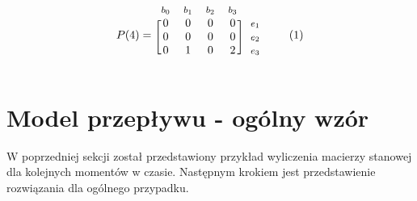 \documentclass[12pt]{book}
\newcommand\addtag{\refstepcounter{equation}
\renewcommand{\labelenumii}{\theenumii}
\renewcommand{\theenumii}{\theenumi.\arabic{enumii}.}
\tag{\theequation}}
\begin{document}
\begin{equation*}
  P(4)=
  \begin{blockarray}{*{4}{c} l}
    \begin{block}{*{4}{>{$\footnotesize}c<{$}} l}
     $b_0$ & $b_1$ & $b_2$ & $b_3$ \\
    \end{block}
    \begin{block}{[*{4}{c}]>{$\footnotesize}l<{$}}
       0 & 0 & 0 & 0 & $e_1$ \\
       0 & 0 & 0 & 0 & $e_2$ \\
       0 & 1 & 0 & 2 & $e_3$ \\
    \end{block}
  \end{blockarray} \addtag
\end{equation*}

\section{Model przepływu - ogólny wzór}
W poprzedniej sekcji został przedstawiony przykład wyliczenia macierzy stanowej dla kolejnych momentów w czasie. Następnym krokiem jest przedstawienie rozwiązania dla ogólnego przypadku. \\ 
\end{document}
